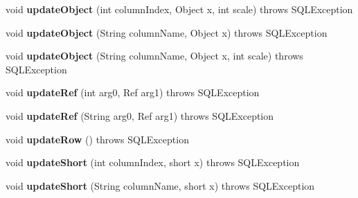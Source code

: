 \begin{DoxyCompactItemize}
void {\bfseries update\+Object} (int column\+Index, Object x, int scale)  throws S\+Q\+L\+Exception 
\item 
\mbox{\label{classcom_1_1mysql_1_1cj_1_1jdbc_1_1result_1_1_result_set_impl_ad6b76152160d9b840e8904f5aff193ea}} 
void {\bfseries update\+Object} (String column\+Name, Object x)  throws S\+Q\+L\+Exception 
\item 
\mbox{\label{classcom_1_1mysql_1_1cj_1_1jdbc_1_1result_1_1_result_set_impl_abffa5ce5112562274b4ddba5bfb68d6e}} 
void {\bfseries update\+Object} (String column\+Name, Object x, int scale)  throws S\+Q\+L\+Exception 
\item 
\mbox{\label{classcom_1_1mysql_1_1cj_1_1jdbc_1_1result_1_1_result_set_impl_a675edcd78b9e9d76a277a2a58ce17d2e}} 
void {\bfseries update\+Ref} (int arg0, Ref arg1)  throws S\+Q\+L\+Exception 
\item 
\mbox{\label{classcom_1_1mysql_1_1cj_1_1jdbc_1_1result_1_1_result_set_impl_a424800ca1453bb55aa6ae2d15ea5fe1b}} 
void {\bfseries update\+Ref} (String arg0, Ref arg1)  throws S\+Q\+L\+Exception 
\item 
\mbox{\label{classcom_1_1mysql_1_1cj_1_1jdbc_1_1result_1_1_result_set_impl_a33db098f120558983f3c05386352ee44}} 
void {\bfseries update\+Row} ()  throws S\+Q\+L\+Exception 
\item 
\mbox{\label{classcom_1_1mysql_1_1cj_1_1jdbc_1_1result_1_1_result_set_impl_a38c521e0192fcf943f61658082e5ecba}} 
void {\bfseries update\+Short} (int column\+Index, short x)  throws S\+Q\+L\+Exception 
\item 
\mbox{\label{classcom_1_1mysql_1_1cj_1_1jdbc_1_1result_1_1_result_set_impl_aceaa3a49c64168df2eac52d8ed10579e}} 
void {\bfseries update\+Short} (String column\+Name, short x)  throws S\+Q\+L\+Exception 
\item 

\end{DoxyCompactItemize}
